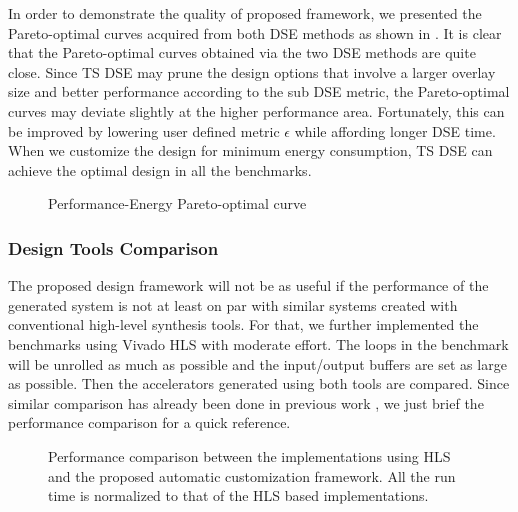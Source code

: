 In order to demonstrate the quality of proposed framework, we presented the 
Pareto-optimal curves acquired from both DSE methods as shown in . 
It is clear that the Pareto-optimal curves obtained via the two DSE methods are quite 
close. Since TS DSE may prune the design options that involve a larger 
overlay size and better performance according to the sub DSE metric, 
the Pareto-optimal curves may deviate slightly at the higher performance area. 
Fortunately, this can be improved by lowering user defined metric $\epsilon$ 
while affording longer DSE time. When we customize the design for minimum energy 
consumption, TS DSE can achieve the optimal design in all the benchmarks. 

\begin{figure}[tb]
    \hfill
    \caption{Performance-Energy Pareto-optimal curve}
	\label{fig:DSE}
\end{figure}

\subsubsection{Design Tools Comparison}
The proposed design framework will not be as useful if the performance of the 
generated system is not at least on par with similar systems created with 
conventional high-level synthesis tools. For that, we further implemented the 
benchmarks using Vivado HLS with moderate effort. The loops in the benchmark will 
be unrolled as much as possible and the input/output buffers are set as large 
as possible. Then the accelerators generated using both tools are compared. 
Since similar comparison has already been done in previous work \cite{scgra-orig}, 
we just brief the performance comparison for a quick reference.

\begin{figure}[tb]
    \hfill
    \caption{Performance comparison between the implementations 
        using HLS and the proposed automatic customization framework.
    All the run time is normalized to that of the HLS based implementations.}
	\label{fig:hls-cp}
\end{figure}


